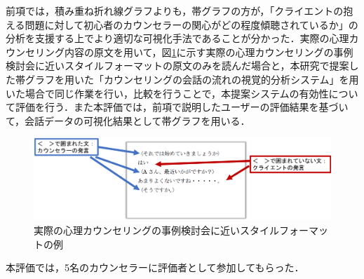 \documentclass[shuuron]{kuee}
\begin{document}


前項では，積み重ね折れ線グラフよりも，帯グラフの方が，「クライエントの抱える問題に対して初心者のカウンセラーの関心がどの程度傾聴されているか」の分析を支援する上でより適切な可視化手法であることが分かった．実際の心理カウンセリング内容の原文を用いて，図\ref{fig:pdf}に示す実際の心理カウンセリングの事例検討会に近いスタイルフォーマットの原文のみを読んだ場合と，本研究で提案した帯グラフを用いた「カウンセリングの会話の流れの視覚的分析システム」を用いた場合で同じ作業を行い，比較を行うことで，本提案システムの有効性について評価を行う．また本評価では，前項で説明したユーザーの評価結果を基づいて，会話データの可視化結果として帯グラフを用いる．

\begin{figure}
  \begin{center}
    \includegraphics[width=\linewidth]{pdf.png}
  \end{center}
  \caption{実際の心理カウンセリングの事例検討会に近いスタイルフォーマットの例}
  \label{fig:pdf}
\end{figure}


本評価では，5名のカウンセラーに評価者として参加してもらった．

\end{document}
